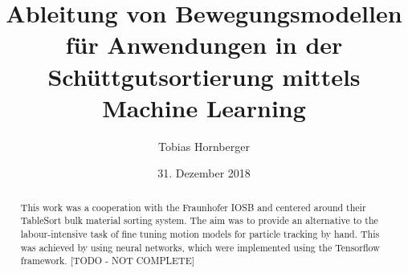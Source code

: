 \documentclass[german]{isasthesis}
\title{Ableitung von Bewegungsmodellen für Anwendungen in der Schüttgutsortierung mittels Machine Learning}
\author{Tobias Hornberger}
\date{31. Dezember 2018}
\begin{document}
    \maketitle

    \begin{abstract}
        This work was a cooperation with the Fraunhofer IOSB and centered around their TableSort bulk material sorting system.
        The aim was to provide an alternative to the labour-intensive task of fine tuning motion models for particle tracking by hand. 
        This was achieved by using neural networks, which were implemented using the Tensorflow framework. 
        [TODO - NOT COMPLETE]
    \end{abstract}

    \maketoc

    
    
    
    
    
    
    


    \nocite{*}
	\cleardoublepage
    \printbibliography %


    \appendix
    
\end{document}
